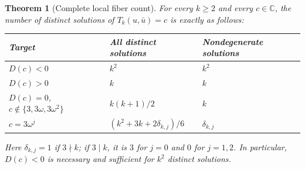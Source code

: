 \documentclass[UTF8,11pt]{ctexart}
\newtheorem{thm}{Theorem}[section]
\theoremstyle{definition}
\numberwithin{equation}{section}
\newcommand{\C}{\mathbb C}\newcommand{\R}{\mathbb R}
\begin{document}
\begin{thm}[Complete local fiber count]\label{v5:thm:fibers}
For every $k\ge2$ and every $c\in\C$, the number of distinct
solutions of $T_k(u,\bar u)=c$ is exactly as follows:
\begin{center}
\begin{tabular}{@{}lll@{}}
\toprule
Target & All distinct solutions & Nondegenerate solutions\\
\midrule
$D(c)<0$ & $k^2$ & $k^2$\\
$D(c)>0$ & $k$ & $k$\\
$D(c)=0$, $c\notin\{3,3\omega,3\omega^2\}$
    & $k(k+1)/2$ & $k$\\
$c=3\omega^j$ & $(k^2+3k+2\delta_{k,j})/6$ & $\delta_{k,j}$\\
\bottomrule
\end{tabular}
\end{center}
Here $\delta_{k,j}=1$ if $3\nmid k$; if $3\mid k$, it is $3$
for $j=0$ and $0$ for $j=1,2$. In particular, $D(c)<0$ is
necessary and sufficient for $k^2$ distinct solutions.
\end{thm}
\end{document}
